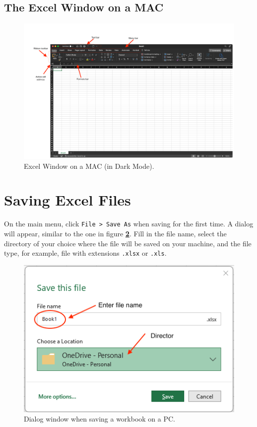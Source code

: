 \documentclass[
]{book}
\begin{document}
\hypertarget{the-excel-window-on-a-mac}{%
\subsection{The Excel Window on a MAC}\label{the-excel-window-on-a-mac}}

\begin{figure}

{\centering \includegraphics[width=1\linewidth]{images/window-mac} 

}

\caption{Excel Window on a MAC (in Dark Mode).}\label{fig:window-mac}
\end{figure}

\hypertarget{saving-excel-files}{%
\section{Saving Excel Files}\label{saving-excel-files}}

On the main menu, click \texttt{File\ \textgreater{}\ Save\ As} when saving for the first time. A dialog will appear, similar to the one in figure \textbf{\ref{fig:saving-dialog-box-pc}}. Fill in the file name, select the directory of your choice where the file will be saved on your machine, and the file type, for example, file with extensions \texttt{.xlsx} or \texttt{.xls}.

\begin{figure}

{\centering \includegraphics[width=0.45\linewidth]{images/saving-pc2} 

}

\caption{Dialog window when saving a workbook on a PC.}\label{fig:saving-dialog-box-pc}
\end{figure}
\end{document}
